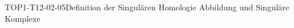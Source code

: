 
\begin{DEF}{TOP1-T12-02-05}{Definition der Singulären Homologie Abbildung und Singuläre Komplexe}
\end{DEF}
